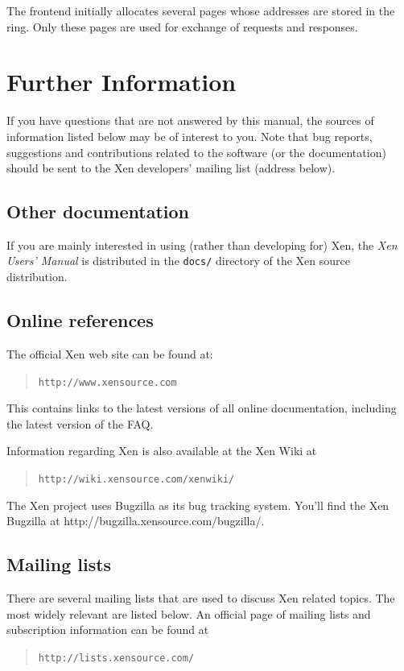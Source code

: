 \documentclass[11pt,twoside,final,openright]{report}
\begin{document}
The frontend initially allocates several pages whose addresses
are stored in the ring. Only these pages are used for exchange of
requests and responses.


\chapter{Further Information}

If you have questions that are not answered by this manual, the
sources of information listed below may be of interest to you.  Note
that bug reports, suggestions and contributions related to the
software (or the documentation) should be sent to the Xen developers'
mailing list (address below).


\section{Other documentation}

If you are mainly interested in using (rather than developing for)
Xen, the \emph{Xen Users' Manual} is distributed in the {\tt docs/}
directory of the Xen source distribution.



\section{Online references}

The official Xen web site can be found at:
\begin{quote} {\tt http://www.xensource.com}
\end{quote}


This contains links to the latest versions of all online
documentation, including the latest version of the FAQ.

Information regarding Xen is also available at the Xen Wiki at
\begin{quote} {\tt http://wiki.xensource.com/xenwiki/}\end{quote}
The Xen project uses Bugzilla as its bug tracking system. You'll find
the Xen Bugzilla at http://bugzilla.xensource.com/bugzilla/.


\section{Mailing lists}

There are several mailing lists that are used to discuss Xen related
topics. The most widely relevant are listed below. An official page of
mailing lists and subscription information can be found at \begin{quote}
  {\tt http://lists.xensource.com/} \end{quote}
\end{document}
